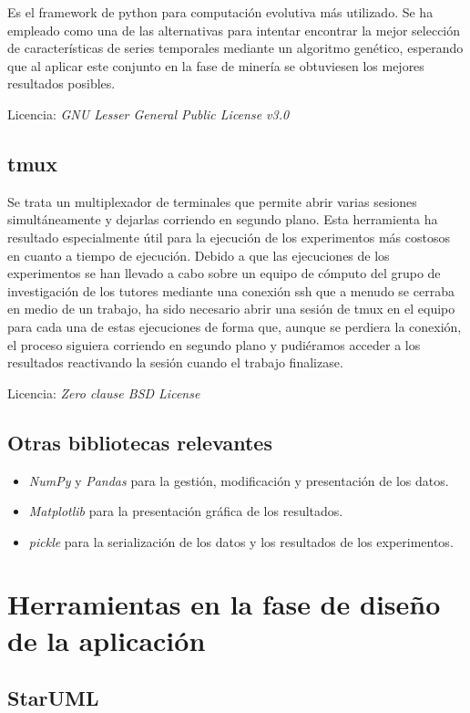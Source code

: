 Es el framework de python para computación evolutiva más utilizado. Se ha empleado como una de las alternativas para intentar encontrar la mejor selección de características de series temporales mediante un algoritmo genético, esperando que al aplicar este conjunto en la fase de minería se obtuviesen los mejores resultados posibles.  

Licencia: \textit{GNU Lesser General Public License v3.0}

\subsection{tmux}

Se trata un multiplexador de terminales que permite abrir varias sesiones simultáneamente y dejarlas corriendo en segundo plano. Esta herramienta ha resultado especialmente útil para la ejecución de los experimentos más costosos en cuanto a tiempo de ejecución. Debido a que las ejecuciones de los experimentos se han llevado a cabo sobre un equipo de cómputo del grupo de investigación de los tutores mediante una conexión ssh que a menudo se cerraba en medio de un trabajo, ha sido necesario abrir una sesión de tmux en el equipo para cada una de estas ejecuciones de forma que, aunque se perdiera la conexión, el proceso siguiera corriendo en segundo plano y pudiéramos acceder a los resultados reactivando la sesión cuando el trabajo finalizase.

Licencia: \textit{Zero clause BSD License}

\subsection{Otras bibliotecas relevantes}
\begin{itemize}
	\item \textit{NumPy} y \textit{Pandas} para la gestión, modificación y presentación de los datos. 
	\item \textit{Matplotlib} para la presentación gráfica de los resultados. 
	\item \textit{pickle} para la serialización de los datos y los resultados de los experimentos. 
\end{itemize}

\section{Herramientas en la fase de diseño de la aplicación}

\subsection{StarUML}

